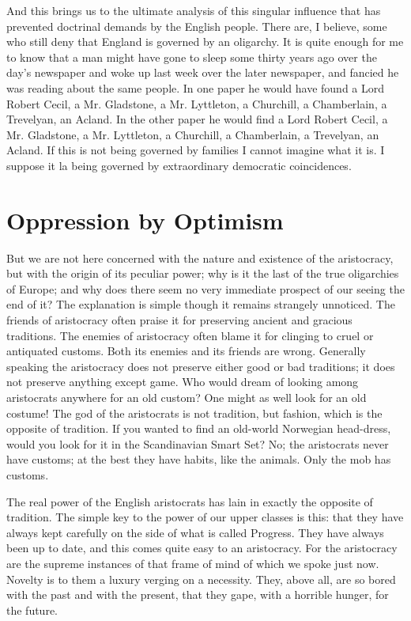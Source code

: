 \documentclass{book}
\begin{document}
And this brings us to the ultimate analysis of this singular influence that has prevented doctrinal demands by the English people. There are, I believe, some who still deny that England is governed by an oligarchy. It is quite enough for me to know that a man might have gone to sleep some thirty years ago over the day’s newspaper and woke up last week over the later newspaper, and fancied he was reading about the same people. In one paper he would have found a Lord Robert Cecil, a Mr. Gladstone, a Mr. Lyttleton, a Churchill, a Chamberlain, a Trevelyan, an Acland. In the other paper he would find a Lord Robert Cecil, a Mr. Gladstone, a Mr. Lyttleton, a Churchill, a Chamberlain, a Trevelyan, an Acland. If this is not being governed by families I cannot imagine what it is. I suppose it la being governed by extraordinary democratic coincidences.

\chapter{Oppression by Optimism}
\label{chapter-11}
But we are not here concerned with the nature and existence of the aristocracy, but with the origin of its peculiar power; why is it the last of the true oligarchies of Europe; and why does there seem no very immediate prospect of our seeing the end of it? The explanation is simple though it remains strangely unnoticed. The friends of aristocracy often praise it for preserving ancient and gracious traditions. The enemies of aristocracy often blame it for clinging to cruel or antiquated customs. Both its enemies and its friends are wrong. Generally speaking the aristocracy does not preserve either good or bad traditions; it does not preserve anything except game. Who would dream of looking among aristocrats anywhere for an old custom? One might as well look for an old costume! The god of the aristocrats is not tradition, but fashion, which is the opposite of tradition. If you wanted to find an old-world Norwegian head-dress, would you look for it in the Scandinavian Smart Set? No; the aristocrats never have customs; at the best they have habits, like the animals. Only the mob has customs.

The real power of the English aristocrats has lain in exactly the opposite of tradition. The simple key to the power of our upper classes is this: that they have always kept carefully on the side of what is called Progress. They have always been up to date, and this comes quite easy to an aristocracy. For the aristocracy are the supreme instances of that frame of mind of which we spoke just now. Novelty is to them a luxury verging on a necessity. They, above all, are so bored with the past and with the present, that they gape, with a horrible hunger, for the future.
\end{document}
